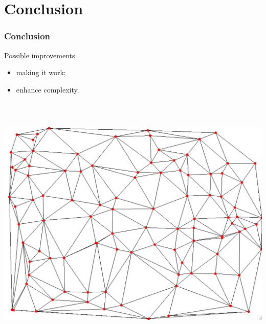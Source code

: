 \documentclass{beamer}
\begin{document}
	
	\section*{Conclusion}
	\begin{frame}
		\frametitle{Conclusion}
		\begin{block}{Possible improvements}
			\begin{itemize}
				\item making it work;
				\item enhance complexity.
			\end{itemize}
		\end{block}
	\end{frame}
	
	
	\begin{frame}
		\frametitle{~}
		\begin{center}
			\includegraphics[scale=0.3]{convexhull-good.png}
		\end{center}
	\end{frame}
\end{document}
